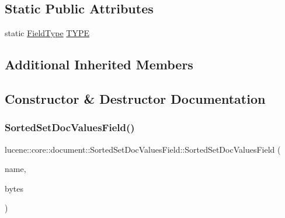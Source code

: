 \subsection*{Static Public Attributes}
\begin{DoxyCompactItemize}
\item 
static \mbox{\hyperlink{classlucene_1_1core_1_1document_1_1FieldType}{Field\+Type}} \mbox{\hyperlink{classlucene_1_1core_1_1document_1_1SortedSetDocValuesField_a93e0580ec4096f4c19090699aab8d5e9}{T\+Y\+PE}}
\end{DoxyCompactItemize}
\subsection*{Additional Inherited Members}


\subsection{Constructor \& Destructor Documentation}
\mbox{\label{classlucene_1_1core_1_1document_1_1SortedSetDocValuesField_a606d942fd2669a07d9ed7fa7575e7248}} 
\subsubsection{\texorpdfstring{Sorted\+Set\+Doc\+Values\+Field()}{SortedSetDocValuesField()}\hspace{0.1cm}{\footnotesize\ttfamily [1/2]}}
{\footnotesize\ttfamily lucene\+::core\+::document\+::\+Sorted\+Set\+Doc\+Values\+Field\+::\+Sorted\+Set\+Doc\+Values\+Field (\begin{DoxyParamCaption}\item[{\mbox{\hyperlink{ZlibCrc32_8h_a2c212835823e3c54a8ab6d95c652660e}{const}} std\+::string \&}]{name,  }\item[{\mbox{\hyperlink{ZlibCrc32_8h_a2c212835823e3c54a8ab6d95c652660e}{const}} \mbox{\hyperlink{classlucene_1_1core_1_1util_1_1BytesRef}{lucene\+::core\+::util\+::\+Bytes\+Ref}} \&}]{bytes }\end{DoxyParamCaption})\hspace{0.3cm}{\ttfamily [inline]}}

